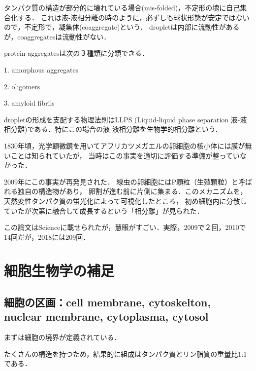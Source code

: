 \documentclass[uplatex, dvipdfmx]{jsreport}
\begin{document}
\begin{definition}[coaggregate]\label{def-coaggregates}
    タンパク質の構造が部分的に壊れている場合(mis-folded)，不定形の塊に自己集合化する．
    これは液-液相分離の時のように，必ずしも球状形態が安定ではないので，不定形で，凝集体(coaggregate)という．
    dropletは内部に流動性があるが，coaggregatesは流動性がない．
\end{definition}
\begin{example}
    protein aggregatesは次の３種類に分類できる．

    1. amorphous aggregates
    
    2. oligomers
    
    3. amyloid fibrils
\end{example}
\begin{definition}[生物学的相分離]
    dropletの形成を支配する物理法則はLLPS (Liquid-liquid phase separation 液-液相分離)である．特にこの場合の液-液相分離を生物学的相分離という．
\end{definition}
\begin{example}
    1830年頃，光学顕微鏡を用いてアフリカツメガエルの卵細胞の核小体には膜が無いことは知られていたが，
    当時はこの事実を適切に評価する準備が整っていなかった．

    2009年にこの事実が再発見された．
    線虫の卵細胞にはP顆粒（生殖顆粒）と呼ばれる独自の構造物があり，
    卵割が進む前に片側に集まる．このメカニズムを，天然変性タンパク質の蛍光化によって可視化したところ，
    初め細胞内に分散していたが次第に融合して成長するという「相分離」が見られた\cite{Clifford Brangwynne Anthony Hyman 09 Science}．

    この論文はScienceに載せられたが，慧眼がすごい．実際，2009で２回，2010で14回だが，2018には209回．
\end{example}

\section{細胞生物学の補足}

\subsection{細胞の区画：cell membrane, cytoskelton, nuclear membrane, cytoplasma, cytosol}

まずは細胞の境界が定義されている．

\begin{definition}
    たくさんの構造を持つため，結果的に組成はタンパク質とリン脂質の重量比1:1である．
\end{definition}
\end{document}
